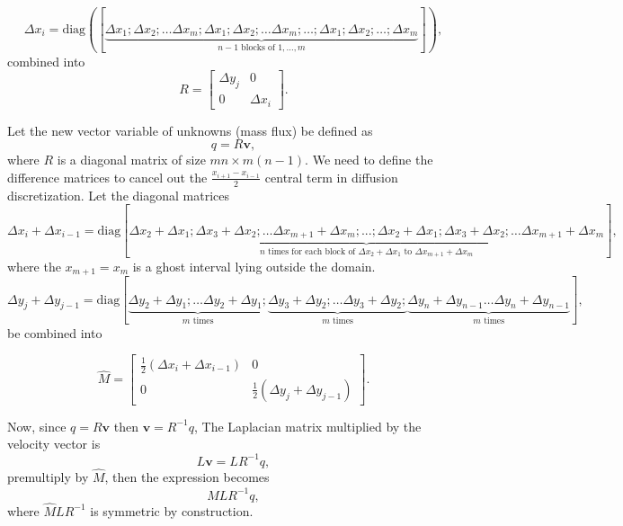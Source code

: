 \documentclass{article}
\begin{document}
$$ \Delta x_i=\text{diag}([\underbrace{\Delta x_1; \Delta x_2;\dotsc\Delta x_m;\Delta x_1; \Delta x_2;\dotsc\Delta x_m; \dotsc;\Delta x_1; \Delta x_2;\dotsc;\Delta x_m}_{n-1\text{ blocks of } 1,\dotsc,m}]),$$
combined into
\begin{equation*}
R =\left[\begin{array}{cc}
\Delta y_j & 0 \\
0 & \Delta x_i
\end{array}\right].
\end{equation*}

Let the new vector variable of unknowns (mass flux) be defined as
$${q} = R\boldsymbol{v},$$ 
where $R$ is a diagonal matrix of size $mn\times m(n-1)$. We need to define the difference matrices to cancel out the $\frac{x_{i+1}−x_{i-1}}{2}$ central term in diffusion discretization. Let the diagonal matrices
\begin{equation*}
{\Delta x_i+\Delta x_{i-1}} = \text{diag}[\underbrace{\Delta x_2+\Delta x_1; \Delta x_3+\Delta x_2; \dotsc \Delta x_{m+1}+\Delta x_{m}; ...;\Delta x_2+\Delta x_1; \Delta x_3+\Delta x_2; \dotsc \Delta x_{m+1}+\Delta x_{m}}_{n\text{ times for each block of } \Delta x_2+\Delta x_1\text{ to }\Delta x_{m+1}+\Delta x_{m}}],
\end{equation*}
where the $x_{m+1}=x_m$ is a ghost interval lying outside the domain. 
\begin{equation*}
{\Delta y_j+\Delta y_{j-1}} = \text{diag}[\underbrace{\Delta y_2+\Delta y_1;  \dotsc \Delta y_2+\Delta y_1;}_{m\text{ times}} \underbrace{\Delta y_3+\Delta y_2; \dotsc \Delta y_3+\Delta y_2;}_{m\text{ times}} \underbrace{\Delta y_n+\Delta y_{n-1}\dotsc \Delta y_n+\Delta y_{n-1}}_{m\text{ times}}],	
\end{equation*}
be combined into

\begin{equation*}
\hat{M} =\left[\begin{array}{cc}
\frac{1}{2}\left(\Delta x_i+\Delta x_{i-1}\right) & 0 \\
0 & \frac{1}{2}\left(\Delta y_j+\Delta y_{j-1}\right)
\end{array}\right].
\end{equation*}

Now, since ${q}=R\boldsymbol{v}$ then $\boldsymbol{v}=R^{-1}{q}$, The Laplacian matrix multiplied by the velocity vector is
$$L\boldsymbol{v}= LR^{-1}{q},$$ 
premultiply by $\hat M$, then the expression becomes 
$$\hat MLR^{-1}{q},$$ 
where $\hat M L R^{-1}$ is symmetric by construction.  
\end{document}
